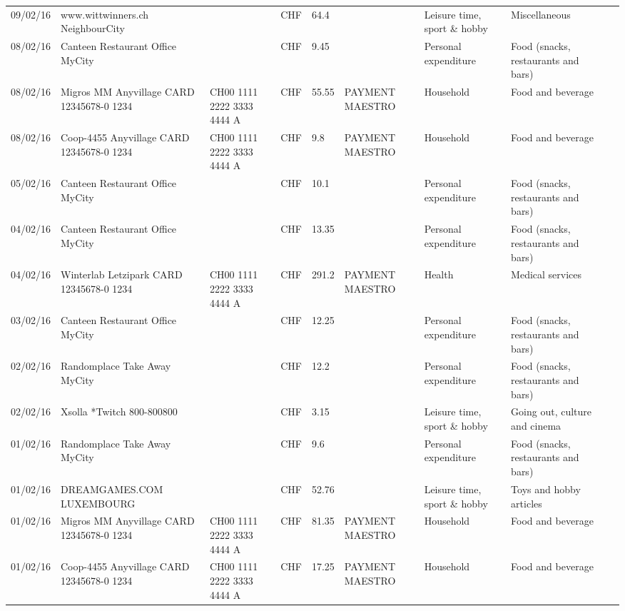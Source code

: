 \begin{landscape}
\begin{tiny}
\begin{longtable}{lp{4cm}llllp{3cm}ll}
		    09/02/16 & www.wittwinners.ch        NeighbourCity &       & CHF   & 64.4  &       & Leisure time, sport \& hobby & Miscellaneous \\
		    08/02/16 & Canteen Restaurant Office      MyCity &       & CHF   & 9.45  &       & Personal expenditure & Food (snacks, restaurants and bars) \\
		    08/02/16 & Migros MM Anyvillage CARD 12345678-0 1234 & CH00 1111 2222 3333 4444 A & CHF   & 55.55 & PAYMENT MAESTRO & Household & Food and beverage \\
		    08/02/16 & Coop-4455 Anyvillage CARD 12345678-0 1234 & CH00 1111 2222 3333 4444 A & CHF   & 9.8   & PAYMENT MAESTRO & Household & Food and beverage \\
		    05/02/16 & Canteen Restaurant Office      MyCity &       & CHF   & 10.1  &       & Personal expenditure & Food (snacks, restaurants and bars) \\
		    04/02/16 & Canteen Restaurant Office      MyCity &       & CHF   & 13.35 &       & Personal expenditure & Food (snacks, restaurants and bars) \\
		    04/02/16 & Winterlab Letzipark CARD 12345678-0 1234 & CH00 1111 2222 3333 4444 A & CHF   & 291.2 & PAYMENT MAESTRO & Health & Medical services  \\
		    03/02/16 & Canteen Restaurant Office      MyCity &       & CHF   & 12.25 &       & Personal expenditure & Food (snacks, restaurants and bars) \\
		    02/02/16 & Randomplace Take Away     MyCity &       & CHF   & 12.2  &       & Personal expenditure & Food (snacks, restaurants and bars) \\
		    02/02/16 & Xsolla *Twitch           800-800800 &       & CHF   & 3.15  &       & Leisure time, sport \& hobby & Going out, culture and cinema \\
		    01/02/16 & Randomplace Take Away     MyCity &       & CHF   & 9.6   &       & Personal expenditure & Food (snacks, restaurants and bars) \\
		    01/02/16 & DREAMGAMES.COM           LUXEMBOURG &       & CHF   & 52.76 &       & Leisure time, sport \& hobby & Toys and hobby articles \\
		    01/02/16 & Migros MM Anyvillage CARD 12345678-0 1234 & CH00 1111 2222 3333 4444 A & CHF   & 81.35 & PAYMENT MAESTRO & Household & Food and beverage \\
		    01/02/16 & Coop-4455 Anyvillage CARD 12345678-0 1234 & CH00 1111 2222 3333 4444 A & CHF   & 17.25 & PAYMENT MAESTRO & Household & Food and beverage \\

\end{longtable}
\end{tiny}
\end{landscape}
